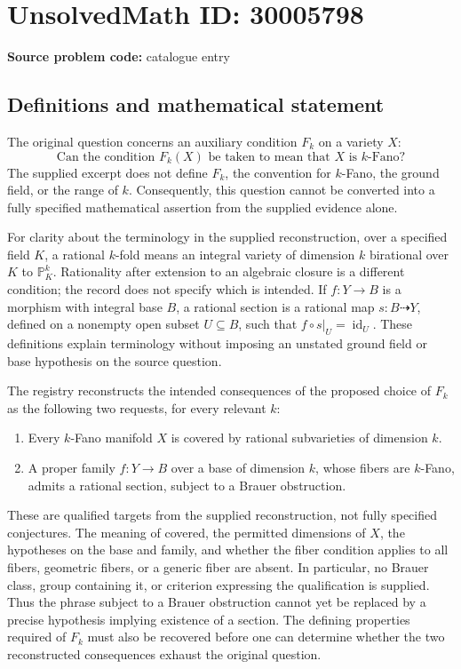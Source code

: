 \documentclass[11pt]{article}
\newcommand{\PP}{\mathbb{P}}
\begin{document}
\section*{UnsolvedMath ID: 30005798}
\textbf{Source problem code:} catalogue entry
\subsection{Definitions and mathematical statement}
The original question concerns an auxiliary condition \(F_k\) on a variety \(X\):
\[
\text{Can the condition }F_k(X)\text{ be taken to mean that }X\text{ is }k\text{-Fano}?
\]
The supplied excerpt does not define \(F_k\), the convention for \(k\)-Fano, the ground field, or the range of \(k\). Consequently, this question cannot be converted into a fully specified mathematical assertion from the supplied evidence alone.

For clarity about the terminology in the supplied reconstruction, over a specified field \(K\), a rational \(k\)-fold means an integral variety of dimension \(k\) birational over \(K\) to \(\PP^k_K\). Rationality after extension to an algebraic closure is a different condition; the record does not specify which is intended. If \(f\colon Y\to B\) is a morphism with integral base \(B\), a rational section is a rational map \(s\colon B\dashrightarrow Y\), defined on a nonempty open subset \(U\subseteq B\), such that \(f\circ s|_U=\operatorname{id}_U\). These definitions explain terminology without imposing an unstated ground field or base hypothesis on the source question.

The registry reconstructs the intended consequences of the proposed choice of \(F_k\) as the following two requests, for every relevant \(k\):
\begin{enumerate}
\item Every \(k\)-Fano manifold \(X\) is covered by rational subvarieties of dimension \(k\).
\item A proper family \(f\colon Y\to B\) over a base of dimension \(k\), whose fibers are \(k\)-Fano, admits a rational section, subject to a Brauer obstruction.
\end{enumerate}
These are qualified targets from the supplied reconstruction, not fully specified conjectures. The meaning of covered, the permitted dimensions of \(X\), the hypotheses on the base and family, and whether the fiber condition applies to all fibers, geometric fibers, or a generic fiber are absent. In particular, no Brauer class, group containing it, or criterion expressing the qualification is supplied. Thus the phrase subject to a Brauer obstruction cannot yet be replaced by a precise hypothesis implying existence of a section. The defining properties required of \(F_k\) must also be recovered before one can determine whether the two reconstructed consequences exhaust the original question.
\end{document}
